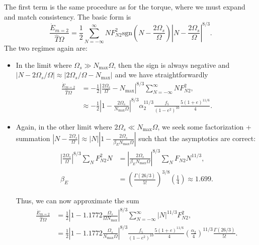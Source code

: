 \documentclass[
        fleqn,
        usenatbib,
        referee,
    ]{mnras}
\newcommand*{\abs}[1]{\left|#1\right|}
\newcommand*{\p}[1]{\left(#1\right)}
\begin{document}
The first term is the same procedure as for the torque, where we must expand and
match consistency. The basic form is
\begin{equation}
    \frac{\dot{E}_{m=2}}{\hat{T}\Omega} = \frac{1}{2}
        \sum\limits_{N = -\infty}^\infty NF_{N2}^2 \mathrm{sgn}\p{N -
            \frac{2\Omega_s}{\Omega}} \abs{N - \frac{2\Omega_s}{\Omega}}^{8/3}.
\end{equation}
The two regimes again are:
\begin{itemize}
    \item In the limit where $\Omega_s \gg N_{\max}\Omega$, then the sign is
        always negative and $\abs{N - 2\Omega_s / \Omega} \approx
        \abs{2\Omega_s / \Omega - N_{\max}}$ and we have straightforwardly
        \begin{align}
            \frac{\dot{E}_{m=2}}{\hat{T}\Omega}
                &= -\frac{1}{2}
                    \abs{\frac{2\Omega_s}{\Omega} - N_{\max}}^{8/3}
                    \sum\limits_{N = -\infty}^\infty NF_{N2}^2,\\
                &\approx -\frac{1}{2}
                    \abs{1 - \frac{2\Omega_s}{N_{\max}\Omega}}^{8/3}
                    \alpha_2^{11/3}
                    \frac{f_5}{\p{1 - e^2}^{10}}\frac{5\p{1 + e}^{11/6}}{4}.
        \end{align}
    \item Again, in the other limit where $2\Omega_s \ll N_{\max}\Omega$, we
        seek some factorization + summation $\abs{N - \frac{2\Omega_s}{\Omega}}
        \approx \abs{N}\abs{1 - \frac{2\Omega_s}{\beta_E N_{\max}\Omega}}$ such
        that the asymptotics are correct:
        \begin{align}
            \abs{\frac{2\Omega_s}{\Omega}}^{8/3} \sum\limits_N F_{N2}^2 N
                &= \abs{\frac{2\Omega_s}{\beta_E N_{\max}\Omega}}^{8/3}
                    \sum\limits_N F_{N2}N^{11/3},\\
            \beta_E
                &= \p{\frac{\Gamma(26/3)}{5!}}^{3/8} \p{\frac{1}{4}}
                    \approx 1.699.
        \end{align}

        Thus, we can now approximate the sum
        \begin{align}
            \frac{\dot{E}_{m=2}}{\hat{T}\Omega}
                &= \frac{1}{2}
                    \abs{1 - 1.1772\frac{\Omega_s}{\Omega N_{\max}}}^{8/3}
                    \sum\limits_{N = -\infty}^\infty \abs{N}^{11/3}F_{N2}^2,\\
                &= \frac{1}{2}
                    \abs{1 - 1.1772\frac{\Omega_s}{N_{\max}\Omega}}^{8/3}
                    \frac{f_5}{\p{1 - e^2}^{10}}\frac{5\p{1 + e}^{11/6}}{4}
                    \p{\frac{\alpha_2}{4}}^{11/3}
                    \frac{\Gamma(26/3)}{5!}.
        \end{align}
\end{itemize}
\end{document}
